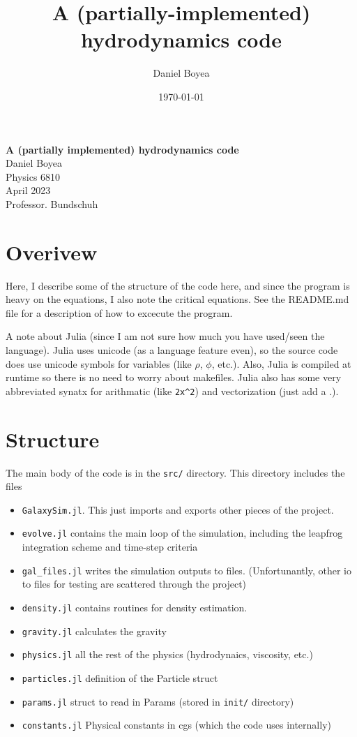 \documentclass[12pt]{article}
\title{A (partially-implemented) hydrodynamics code}
\date{\today}
\author{Daniel Boyea}
\begin{document}
   \begin{center}
       {\bf A (partially implemented) hydrodynamics code}\\
       \vspace*{3\baselineskip}
       {Daniel Boyea}\\
       \vspace*{\baselineskip}
       Physics 6810\\
       \vspace*{\baselineskip}
       April 2023\\
       \vspace*{\baselineskip}
       Professor. Bundschuh
       \vspace*{3\baselineskip}
   \end{center}


\section{Overivew}
Here, I describe some of the structure of the code here, and since the program is heavy on the equations, I also note the critical equations. 
See the README.md file for a description of how to excecute the program. 

A note about Julia (since I am not sure how much you have used/seen the language). Julia uses unicode (as a language feature even), so the source code does use unicode symbols for variables (like $\rho$, $\phi$, etc.). Also, Julia is compiled at runtime so there is no need to worry about makefiles. Julia also has some very abbreviated synatx for arithmatic (like \verb|2x^2|) and vectorization (just add a .).

\section{Structure}
The main body of the code is in the \texttt{src/} directory. This directory includes the files
\begin{itemize}
    \item \texttt{GalaxySim.jl}. This just imports and exports other pieces of the project.
    \item \texttt{evolve.jl} contains the main loop of the simulation, including the leapfrog integration scheme and time-step criteria
    \item \verb|gal_files.jl| writes the simulation outputs to files. (Unfortunantly, other io to files for testing are scattered through the project)
    \item \texttt{density.jl} contains routines for density estimation.
    \item \texttt{gravity.jl} calculates the gravity
    \item \texttt{physics.jl} all the rest of the physics (hydrodynaics, viscosity, etc.)
    \item \texttt{particles.jl} definition of the Particle struct
    \item \texttt{params.jl} struct to read in Params (stored in \texttt{init/} directory)
    \item \texttt{constants.jl} Physical constants in cgs (which the code uses internally)
\end{itemize}
\end{document}
